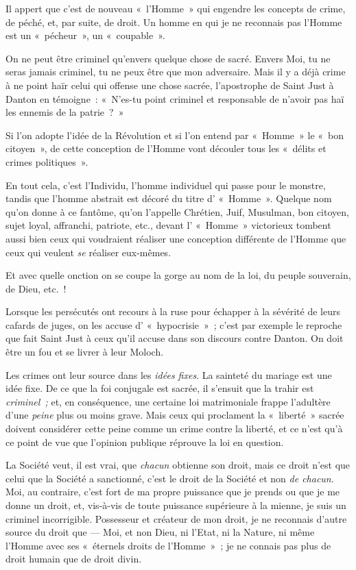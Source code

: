 \documentclass[french,twoside]{book} %
\begin{document}
 Il appert que c’est de nouveau « l’Homme » qui engendre les concepts de crime, de péché, et, par suite, de droit. Un homme en qui je ne reconnais pas l’Homme est un « pécheur », un « coupable ».\par
On ne peut être criminel qu’envers quelque chose de sacré. Envers Moi, tu ne seras jamais criminel, tu ne peux être que mon adversaire. Mais il y a déjà crime à ne point haïr celui qui offense une chose sacrée, l’apostrophe de Saint Just à Danton en témoigne : « N’es-tu point criminel et responsable de n’avoir pas haï les ennemis de la patrie ? »\par
Si l’on adopte l’idée de la Révolution et si l’on entend par « Homme » le « bon citoyen », de cette conception de l’Homme vont découler tous les « délits et crimes politiques ».\par
En tout cela, c’est l’Individu, l’homme individuel qui passe pour le monstre, tandis que l’homme abstrait est décoré du titre d’ « Homme ». Quelque nom qu’on donne à ce fantôme, qu’on l’appelle Chrétien, Juif, Musulman, bon citoyen, sujet loyal, affranchi, patriote, etc., devant l’ « Homme » victorieux tombent aussi bien ceux qui voudraient réaliser une conception différente de l’Homme que ceux qui veulent \emph{se} réaliser eux-mêmes.\par
Et avec quelle onction on se coupe la gorge au nom de la loi, du peuple souverain, de Dieu, etc. !\par
Lorsque les persécutés ont recours à la ruse pour échapper à la sévérité de leurs cafards de juges, on les accuse d’ « hypocrisie » ; c’est par exemple le reproche que fait Saint Just à ceux qu’il accuse dans son discours contre Danton. On doit être un fou et se livrer à leur Moloch.\par
Les crimes ont leur source dans les \emph{idées fixes}. La sainteté du mariage est une idée fixe. De ce que la foi conjugale est sacrée, il s’ensuit que la trahir est \emph{criminel ;} et, en conséquence, une certaine loi matrimoniale frappe l’adultère d’une \emph{peine} plus ou moins grave. Mais ceux qui proclament la « liberté » sacrée  doivent considérer cette peine comme un crime contre la liberté, et ce n’est qu’à ce point de vue que l’opinion publique réprouve la loi en question.\par
La Société veut, il est vrai, que \emph{chacun} obtienne son droit, mais ce droit n’est que celui que la Société a sanctionné, c’est le droit de la Société et non \emph{de chacun}. Moi, au contraire, c’est fort de ma propre puissance que je prends ou que je me donne un droit, et, vis-à-vis de toute puissance supérieure à la mienne, je suis un criminel incorrigible. Possesseur et créateur de mon droit, je ne reconnais d’autre source du droit que — Moi, et non Dieu, ni l’Etat, ni la Nature, ni même l’Homme avec ses « éternels droits de l’Homme » ; je ne connais pas plus de droit humain que de droit divin.\par
\end{document}
